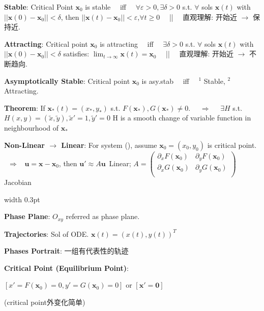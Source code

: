 \documentclass[8pt]{extarticle}
\begin{document}
\begin{minipage}[t]{0.71\textwidth}

    \textbf{Stable}: Critical Point $\mathbf{x}_0$ is stable \ \ iff \ \ $\forall\varepsilon>0,\exists\delta>0$ s.t. $\forall$ sols $\mathbf{x}(t)$ with $||\mathbf{x}(0)-\mathbf{x}_0||<\delta$, then $||\mathbf{x}(t)-\mathbf{x}_0||<\varepsilon$,$\forall t\geq0$ \ \ || \ \ 直观理解: 开始近 $\to$ 保持近.

    \textbf{Attracting}: Critical point $\mathbf{x}_0$ is attracting \ \ iff \ \ $\exists\delta>0$ s.t. $\forall$ sols $\mathbf{x}(t)$ with $||\mathbf{x}(0)-\mathbf{x}_0||<\delta$ satisfies: $\lim_{t\to\infty}\mathbf{x}(t)=\mathbf{x}_0$ \ \ || \ \ 直观理解: 开始近 $\to$ 不断趋向.

    \textbf{Asymptotically Stable}: Critical point $\mathbf{x}_0$ is asy.stab \ \ iff \ \ $^1$ Stable, $^2$ Attracting.

    \textbf{Theorem}: If $\mathbf{x}_\ast(t)=(x_\ast,y_\ast)$ s.t. $F(\mathbf{x}_\ast),G(\mathbf{x}_\ast)\ne0$. \ \ $\Rightarrow$ \ \ $\exists H$ s.t. $H(x,y)=(\tilde{x},\tilde{y}),\tilde{x}'=1,\tilde{y}'=0$ {\tiny H is a smooth change of variable function in neighbourhood of $\mathbf{x}_\ast$}

    \textbf{Non-Linear $\to$ Linear}: For system (\ast\ast), assume $\mathbf{x}_0=(x_0,y_0)$ is critical point. \ $\Rightarrow$ \ $\mathbf{u}=\mathbf{x}-\mathbf{x}_0$, then $\mathbf{u}'\approx A\mathbf{u}${\tiny \ Linear;} {\tiny $A=\begin{pmatrix}\partial_xF(\mathbf{x}_0) & \partial_yF(\mathbf{x}_0) \\ \partial_xG(\mathbf{x}_0) & \partial_yG(\mathbf{x}_0) \\ \end{pmatrix}$} {\tiny Jacobian}

\end{minipage}
\hfill
\vrule width 0.3pt
\hfill
\begin{minipage}[t]{0.28\textwidth}

    \textbf{Phase Plane}: $O_{xy}$ referred as phase plane. 
    
    \textbf{Trajectories}: Sol of ODE. $\mathbf{x}(t)=(x(t),y(t))^T$
    
    \textbf{Phases Portrait}: 一组有代表性的轨迹

    \textbf{Critical Point (Equilibrium Point)}:
    
    $[x'=F(\mathbf{x}_0)=0,y'=G(\mathbf{x}_0)=0]$ {\scriptsize or} $[\mathbf{x}'=\mathbf{0}]$
    
    \hspace{60pt} {\tiny (critical point外变化简单)}

\end{minipage}
\end{document}
